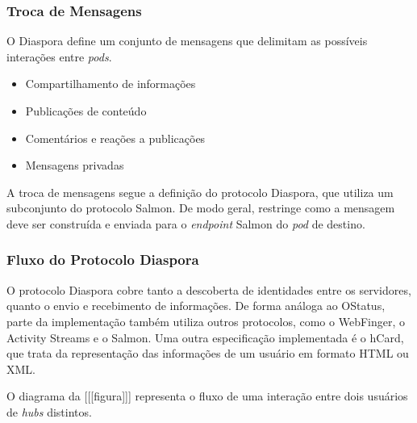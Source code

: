 \subsubsection{Troca de Mensagens}

O Diaspora define um conjunto de mensagens que delimitam as possíveis interações
entre \textit{pods}.

\begin{itemize}
  \item{Compartilhamento de informações}
  \item{Publicações de conteúdo}
  \item{Comentários e reações a publicações}
  \item{Mensagens privadas}
\end{itemize}

A troca de mensagens segue a definição do protocolo Diaspora, que utiliza um
subconjunto do protocolo Salmon. De modo geral, restringe como a mensagem deve ser
construída e enviada para o \textit{endpoint} Salmon do \textit{pod} de destino. 

\subsubsection{Fluxo do Protocolo Diaspora}

O protocolo Diaspora cobre tanto a descoberta de identidades entre os servidores,
quanto o envio e recebimento de informações. De forma análoga ao OStatus, parte da
implementação também utiliza outros protocolos, como o WebFinger, o Activity Streams
e o Salmon. Uma outra especificação implementada é o hCard, que trata da
representação das informações de um usuário em formato HTML ou XML. %

O diagrama da [[[figura]]] representa o fluxo de uma interação entre dois usuários de
\textit{hubs} distintos.



